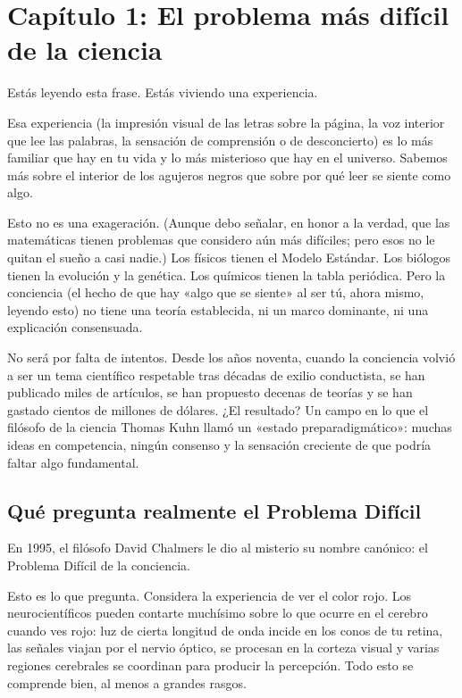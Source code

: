\documentclass[11pt, twoside, openright]{book}
\begin{document}
\mainmatter
\pagestyle{fancy}
\chapter*{Capítulo 1: El problema más difícil de la ciencia}

Estás leyendo esta frase. Estás viviendo una experiencia.

Esa experiencia (la impresión visual de las letras sobre la página, la voz interior que lee las palabras, la sensación de comprensión o de desconcierto) es lo más familiar que hay en tu vida y lo más misterioso que hay en el universo. Sabemos más sobre el interior de los agujeros negros que sobre por qué leer se siente como algo.

Esto no es una exageración. (Aunque debo señalar, en honor a la verdad, que las matemáticas tienen problemas que considero aún más difíciles; pero esos no le quitan el sueño a casi nadie.) Los físicos tienen el Modelo Estándar. Los biólogos tienen la evolución y la genética. Los químicos tienen la tabla periódica. Pero la conciencia (el hecho de que hay «algo que se siente» al ser tú, ahora mismo, leyendo esto) no tiene una teoría establecida, ni un marco dominante, ni una explicación consensuada.

No será por falta de intentos. Desde los años noventa, cuando la conciencia volvió a ser un tema científico respetable tras décadas de exilio conductista, se han publicado miles de artículos, se han propuesto decenas de teorías y se han gastado cientos de millones de dólares. ¿El resultado? Un campo en lo que el filósofo de la ciencia Thomas Kuhn llamó un «estado preparadigmático»: muchas ideas en competencia, ningún consenso y la sensación creciente de que podría faltar algo fundamental.

\section*{Qué pregunta realmente el Problema Difícil}

En 1995, el filósofo David Chalmers le dio al misterio su nombre canónico: el Problema Difícil de la conciencia.

Esto es lo que pregunta. Considera la experiencia de ver el color rojo. Los neurocientíficos pueden contarte muchísimo sobre lo que ocurre en el cerebro cuando ves rojo: luz de cierta longitud de onda incide en los conos de tu retina, las señales viajan por el nervio óptico, se procesan en la corteza visual y varias regiones cerebrales se coordinan para producir la percepción. Todo esto se comprende bien, al menos a grandes rasgos.
\end{document}
